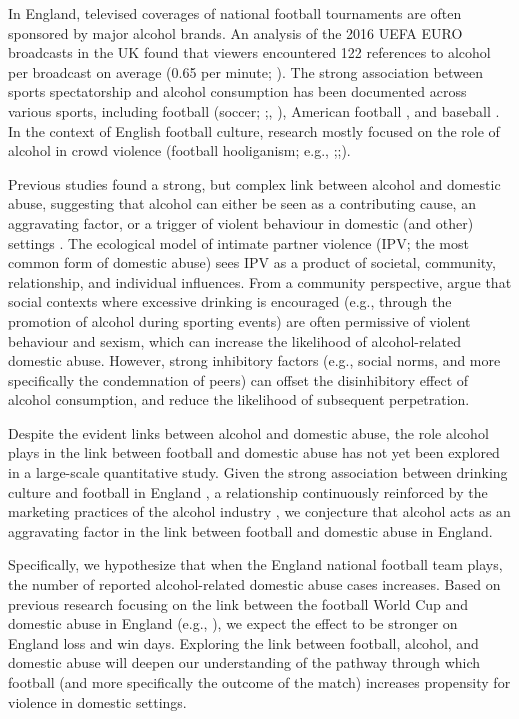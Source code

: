 \documentclass[12pt, a4paper]{article}
\begin{document}
In England, televised coverages of national football tournaments are often sponsored by major alcohol brands. An analysis of the 2016 UEFA EURO broadcasts in the UK found that viewers encountered 122 references to alcohol per broadcast on average (0.65 per minute; ). The strong association between sports spectatorship and alcohol consumption has been documented across various sports, including football (soccer; ;, ), American football \cite{Glassman2011}, and baseball \cite{Erickson2011}. In the context of English football culture, research mostly focused on the role of alcohol in crowd violence (football hooliganism; e.g., ;;).

Previous studies found a strong, but complex link between alcohol and domestic abuse, suggesting that alcohol can either be seen as a contributing cause, an aggravating factor, or a trigger of violent behaviour in domestic (and other) settings \cite{Leonard2017}. The ecological model of intimate partner violence (IPV; the most common form of domestic abuse) sees IPV as a product of societal, community, relationship, and individual influences. From a community perspective,  argue that social contexts where excessive drinking is encouraged (e.g., through the promotion of alcohol during sporting events) are often permissive of violent behaviour and sexism, which can increase the likelihood of alcohol-related domestic abuse. However, strong inhibitory factors (e.g., social norms, and more specifically the condemnation of peers) can offset the disinhibitory effect of alcohol consumption, and reduce the likelihood of subsequent perpetration.



Despite the evident links between alcohol and domestic abuse, the role alcohol plays in the link between football and domestic abuse has not yet been explored in a large-scale quantitative study. Given the strong association between drinking culture and football in England \cite{Dixon2014}, a relationship continuously reinforced by the marketing practices of the alcohol industry \cite{Gornall2014}, we conjecture that alcohol acts as an aggravating factor in the link between football and domestic abuse in England.

Specifically, we hypothesize that when the England national football team plays, the number of reported alcohol-related domestic abuse cases increases. Based on previous research focusing on the link between the football World Cup and domestic abuse in England (e.g., ), we expect the effect to be stronger on England loss and win days. Exploring the link between football, alcohol, and domestic abuse will deepen our understanding of the pathway through which football (and more specifically the outcome of the match) increases propensity for violence in domestic settings.
\end{document}
